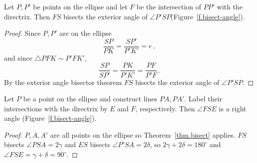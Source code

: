 \begin{theorem}\label{thm.bisect}
Let $P,P'$ be points on the ellipse and let $F$ be the intersection of $PP'$ with the directrix. Then $FS$ bisects the exterior angle of $\angle P'SP$(Figure~\ref{f.bisect-angle}).
\end{theorem}
\begin{proof}
Since $P,P'$ are on the ellipse 
\[
\frac{SP}{PK}=\frac{SP'}{P'K'}=e\,,
\]
and since $\triangle PFK\sim P'FK'$,
\[
\frac{SP}{SP'}=\frac{PK}{P'K'}=\frac{PF}{P'F}\,.
\]
By the exterior angle bisector theorem $FS$ bisects the exterior angle of $\angle P'SP$.\hqed
\end{proof}

\begin{theorem}
Let $P$ be a point on the ellipse and construct lines $PA,PA'$. Label their intersections with the directrix by $E$ and $F$, respectively. Then $\angle FSE$ is a right angle (Figure~\ref{f.bisect-angle}).
\end{theorem}

\begin{proof}
$P,A,A'$ are all points on the ellipse so Theorem~\ref{thm.bisect} applies. $FS$ bisects $\angle PSA=2\gamma$ and $ES$ bisects $\angle P'SA=2\delta$, so $2\gamma + 2\delta= 180^\circ$ and $\angle FSE=\gamma + \delta= 90^\circ$.\hqed
\end{proof}
